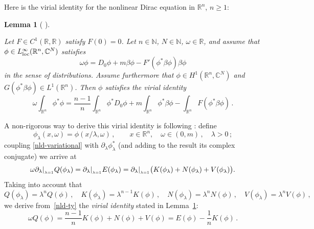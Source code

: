\documentclass[12pt]{extarticle}
\newcommand{\p}{\partial}
\newcommand{\at}[1]{\vert\sb{\sb{#1}}}
\def\R{\mathbb{R}}
\newcommand{\C}{\mathbb{C}}\newcommand{\Z}{\mathbb{Z}}
\newcommand{\N}{\mathbb{N}}
\theoremstyle{plain}
\newtheorem{lemma}{Lemma}[section]
\theoremstyle{remark}
\begin{document}
Here is the virial identity for the
nonlinear Dirac equation
in $\R^n$, $n\ge 1$:
\begin{lemma}[
\mbox{\cite[Lemma IX.15]{boussaid2019nonlinear}}]
\label{Soler_Lemma_Virial_identity}

Let $F\in C^1(\R,\R)$ satisfy
$F(0)=0$.
Let $n\in\N$, $N\in\N$, $\omega\in\R$,
and assume that $\phi\in L\sp\infty\sb{\mathrm{loc}}(\R^n,\C^N)$ satisfies
\[
    \omega\phi=D_0\phi
    +m\beta\phi
    -F'( \phi^*\beta\phi)\beta\phi
\]
in the sense of distributions.
Assume furthermore that
$\phi\in H^1(\R^n,\C^N)$ and
$G( \phi^*\beta\phi)\in L^1(\R^n)$.
Then $\phi$ satisfies the \emph{virial identity}
\[
    \omega\int_{\R^n}\phi^*\phi
    =\frac{n-1}{n}\int_{\R^n}\phi^* D_0\phi
    +m\int_{\R^n}  \phi^*\beta\phi
    -\int_{\R^n} F( \phi^*\beta\phi)\,.
\]
\end{lemma}

A non-rigorous way to derive
this virial identity is
following \cite{derrick1964comments}:
define
\[
    \phi_\lambda(x,\omega)=\phi(x/\lambda,\omega)\,,
    \qquad
    x\in\R^n,
    \quad\omega\in(0,m)\,,
    \quad
    \lambda>0\,;
\]
coupling \eqref{nld-variational}
with $\p_\lambda\phi_\lambda^*$
(and
adding to the result its complex conjugate)
we arrive at
\begin{equation}\label{nld-ty}
    \omega
    \p_\lambda\at{\lambda=1}Q(\phi_\lambda)
    =
    \p_\lambda\at{\lambda=1}E(\phi_\lambda)
    =
    \p_\lambda\at{\lambda=1}
    \bigl(
    K(\phi_\lambda)
    +N(\phi_\lambda)
    +V(\phi_\lambda)
    \bigr).
\end{equation}
Taking into account that
\begin{equation}\label{nld-scaling}
    Q(\phi_\lambda)=\lambda^n Q(\phi)\,,
    \quad
    K(\phi_\lambda)=\lambda^{n-1} K(\phi)\,,
    \quad
    N(\phi_\lambda)=\lambda^n N(\phi)\,,
    \quad
    V(\phi_\lambda)=\lambda^n V(\phi)\,,
\end{equation}
we derive from~\eqref{nld-ty}
the \emph{virial identity} stated in Lemma~\ref{Soler_Lemma_Virial_identity}:
\begin{equation}\label{nld-virial-0}
    \omega Q(\phi) = \frac{n-1}{n} K(\phi) + N(\phi) + V(\phi) = E(\phi) - \frac{1}{n} K(\phi)\,.
\end{equation}
\end{document}
